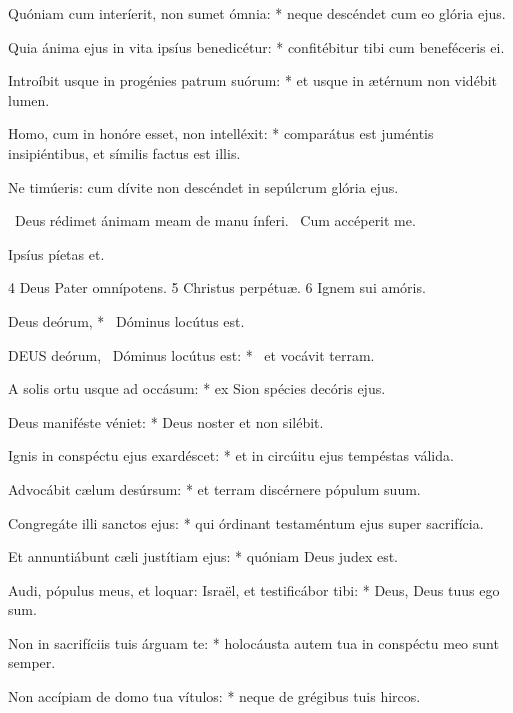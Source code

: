 Quóniam cum interíerit, non sumet ómnia: * neque descéndet cum eo glória ejus.

Quia ánima ejus in vita ipsíus benedicétur: * confitébitur tibi cum beneféceris ei.

Introíbit usque in progénies patrum suórum: * et usque in ætérnum non vidébit lumen.

Homo, cum in honóre esset, non intelléxit: * comparátus est juméntis insipiéntibus, et símilis factus est illis.

 Ne timúeris: cum dívite non descéndet in sepúlcrum glória ejus.


\V\ Deus rédimet ánimam meam de manu ínferi. \R\ Cum accéperit me.

 Ipsíus píetas et.

 4 Deus Pater omnípotens. 5 Christus perpétuæ. 6 Ignem sui amóris.




 Deus deórum, * \textdagger\ Dóminus locútus est. \textdaggerdbl


\lettrine[lines=2]{D}{EUS} deórum, \textdagger\ Dóminus locútus est: * \textdaggerdbl\ et vocávit terram.

A solis ortu usque ad occásum: * ex Sion spécies decóris ejus.

Deus maniféste véniet: * Deus noster et non silébit.

Ignis in conspéctu ejus exardéscet: * et in circúitu ejus tempéstas válida.

Advocábit cælum desúrsum: * et terram discérnere pópulum suum.

Congregáte illi sanctos ejus: * qui órdinant testaméntum ejus super sacrifícia.

Et annuntiábunt cæli justítiam ejus: * quóniam Deus judex est.

Audi, pópulus meus, et loquar: Israël, et testificábor tibi: * Deus, Deus tuus ego sum.

Non in sacrifíciis tuis árguam te: * holocáusta autem tua in conspéctu meo sunt semper.

Non accípiam de domo tua vítulos: * neque de grégibus tuis hircos.

